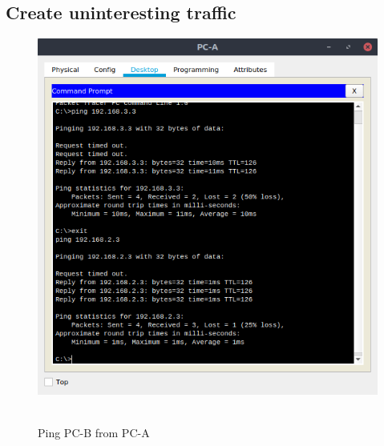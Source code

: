 \documentclass[12pt]{extarticle}
\begin{document}
\subsection{Create uninteresting traffic}
\begin{center}
\begin{figure}[H]
\includegraphics[scale=0.7]{resources/q34.png}\
\caption{Ping PC-B from PC-A}
\end{figure}
\end{center}
\end{document}
